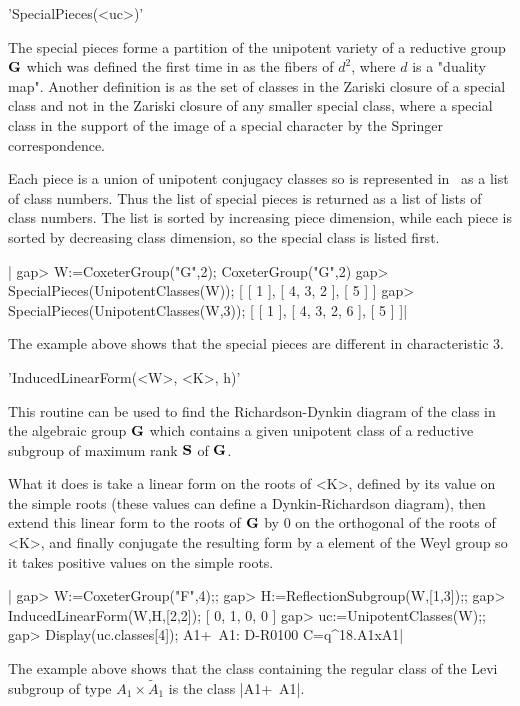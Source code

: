 
'SpecialPieces(<uc>)'

The  special  pieces  forme  a  partition  of  the  unipotent  variety of a
reductive  group  ${\bf G}$  which  was  defined  the first time in \cite[chap.
III]{spalt82} as the fibers of $d^2$, where $d$ is a "duality map". Another
definition  is as the  set of classes  in the Zariski  closure of a special
class  and not in the Zariski closure of any smaller special class, where a
special  class in the  support of the  image of a  special character by the
Springer correspondence.

Each  piece is a union of unipotent  conjugacy classes so is represented in
\CHEVIE\  as a list  of class numbers.  Thus the list  of special pieces is
returned  as  a  list  of  lists  of  class  numbers. The list is sorted by
increasing  piece dimension, while each piece is sorted by decreasing class
dimension, so the special class is listed first.

|    gap> W:=CoxeterGroup("G",2);
    CoxeterGroup("G",2)
    gap> SpecialPieces(UnipotentClasses(W));
    [ [ 1 ], [ 4, 3, 2 ], [ 5 ] ]
    gap> SpecialPieces(UnipotentClasses(W,3));
    [ [ 1 ], [ 4, 3, 2, 6 ], [ 5 ] ]|

The   example  above  shows  that  the  special  pieces  are  different  in
characteristic 3.


'InducedLinearForm(<W>, <K>, h)'

This routine can be used to find the Richardson-Dynkin diagram of the class
in  the algebraic group ${\bf G}$  which contains a given  unipotent class of a
reductive subgroup of maximum rank ${\bf S}$ of ${\bf G}$.

What  it does is  take a linear  form on the  roots of <K>,  defined by its
value  on the  simple roots  (these values  can define  a Dynkin-Richardson
diagram),  then extend this linear form to the roots of ${\bf G}$ by $0$ on the
orthogonal of the roots of <K>, and finally conjugate the resulting form by
a  element of  the Weyl  group so  it takes  positive values  on the simple
roots.

|    gap> W:=CoxeterGroup("F",4);;
    gap> H:=ReflectionSubgroup(W,[1,3]);;
    gap> InducedLinearForm(W,H,[2,2]);
    [ 0, 1, 0, 0 ]
    gap> uc:=UnipotentClasses(W);;
    gap> Display(uc.classes[4]);
    A1+~A1: D-R0100 C=q^18.A1xA1|

The  example above shows that the class containing the regular class of the
Levi subgroup of type $A_1\times \tilde A_1$ is the class |A1+~A1|.

%
%
%
%

